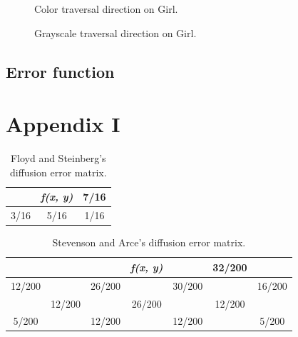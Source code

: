\documentclass[conference]{IEEEtran}
\begin{document}
\begin{figure}[H]
	\centering
	\quad
	\caption{Color traversal direction on Girl.}
	\label{fig:color_traversal_l2r}
\end{figure}

\begin{figure}[H]
	\centering
	\quad
	\caption{Grayscale traversal direction on Girl.}
	\label{fig:gray_traversal_l2r}
\end{figure}

\subsection{Error function}


\section{Appendix I}
\label{sec:appendix1}

\begin{table}[!h]
\centering
\renewcommand{\arraystretch}{1.5}
\begin{tabular}{c|c|c}
     & \textit{f(x, y)} & 7/16 \\ \hline
3/16 & 5/16             & 1/16
\end{tabular}
\caption{Floyd and Steinberg's diffusion error matrix.}
\label{tab:flo}
\end{table}

\begin{table}[!h]
\centering
\renewcommand{\arraystretch}{1.5}
\begin{tabular}{c|c|c|c|c|c|c}
 & \textit{} &  & \textit{f(x, y)} &  & 32/200 &  \\ \hline
12/200 &  & 26/200 &  & 30/200 &  & 16/200 \\ \hline
 & 12/200 &  & 26/200 &  & 12/200 &  \\ \hline
5/200 &  & 12/200 &  & 12/200 &  & 5/200
\end{tabular}
\caption{Stevenson and Arce's diffusion error matrix.}
\label{tab:ste}
\end{table}
\end{document}
